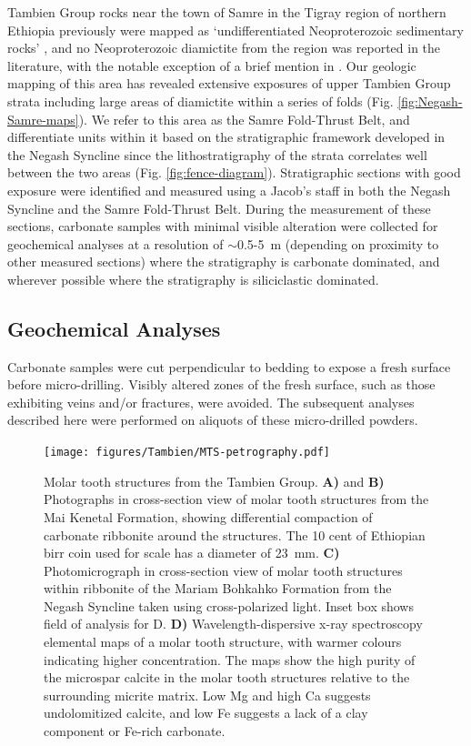 Tambien Group rocks near the town of Samre in the Tigray region of northern Ethiopia previously were mapped as `undifferentiated Neoproterozoic sedimentary rocks' \citep{Arkin1971a}, and no Neoproterozoic diamictite from the region was reported in the literature, with the notable exception of a brief mention in \citet{Bussert2010a}. Our geologic mapping of this area has revealed extensive exposures of upper Tambien Group strata including large areas of diamictite within a series of folds (Fig. \ref{fig:Negash-Samre-maps}). We refer to this area as the Samre Fold-Thrust Belt, and differentiate units within it based on the stratigraphic framework developed in the Negash Syncline \citep{Swanson-Hysell2015a} since the lithostratigraphy of the strata correlates well between the two areas (Fig. \ref{fig:fence-diagram}). Stratigraphic sections with good exposure were identified and measured using a Jacob's staff in both the Negash Syncline and the Samre Fold-Thrust Belt. During the measurement of these sections, carbonate samples with minimal visible alteration were collected for geochemical analyses at a resolution of $\sim$0.5-5~m (depending on proximity to other measured sections) where the stratigraphy is carbonate dominated, and wherever possible where the stratigraphy is siliciclastic dominated.

\subsection{Geochemical Analyses}

Carbonate samples were cut perpendicular to bedding to expose a fresh surface before micro-drilling. Visibly altered zones of the fresh surface, such as those exhibiting veins and/or fractures, were avoided. The subsequent analyses described here were performed on aliquots of these micro-drilled powders.

\begin{figure}[h!]
\begin{center}
	\texttt{[image: figures/Tambien/MTS-petrography.pdf]}
	\caption[Molar tooth structures from the Tambien Group.]{Molar tooth structures from the Tambien Group. \textbf{A)} and \textbf{B)} Photographs in cross-section view of molar tooth structures from the Mai Kenetal Formation, showing differential compaction of carbonate ribbonite around the structures. The 10 cent of Ethiopian birr coin used for scale has a diameter of 23~mm. \textbf{C)} Photomicrograph in cross-section view of molar tooth structures within ribbonite of the Mariam Bohkahko Formation from the Negash Syncline taken using cross-polarized light. Inset box shows field of analysis for D. \textbf{D)} Wavelength-dispersive x-ray spectroscopy elemental maps of a molar tooth structure, with warmer colours indicating higher concentration. The maps show the high purity of the microspar calcite in the molar tooth structures relative to the surrounding micrite matrix. Low Mg and high Ca suggests undolomitized calcite, and low Fe suggests a lack of a clay component or Fe-rich carbonate.}
	\label{fig:MTS-petrography}
\end{center}
\end{figure}

